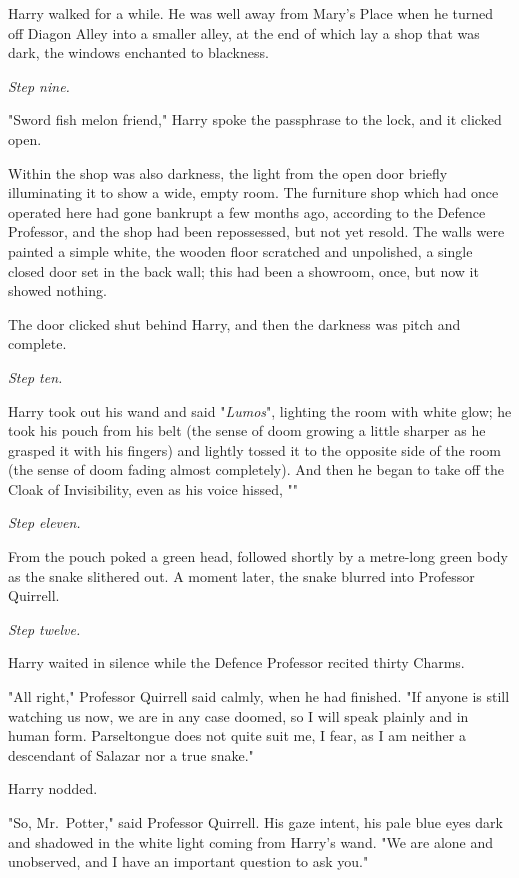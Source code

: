 Harry walked for a while. He was well away from Mary's Place when he turned off
Diagon Alley into a smaller alley, at the end of which lay a shop that was
dark, the windows enchanted to blackness.

\emph{Step nine.}

"Sword fish melon friend," Harry spoke the passphrase to the lock, and it
clicked open.

Within the shop was also darkness, the light from the open door briefly
illuminating it to show a wide, empty room. The furniture shop which had once
operated here had gone bankrupt a few months ago, according to the Defence
Professor, and the shop had been repossessed, but not yet resold. The walls
were painted a simple white, the wooden floor scratched and unpolished, a
single closed door set in the back wall; this had been a showroom, once, but
now it showed nothing.

The door clicked shut behind Harry, and then the darkness was pitch and
complete.

\emph{Step ten.}

Harry took out his wand and said "\emph{Lumos}", lighting the room with white
glow; he took his pouch from his belt (the sense of doom growing a little
sharper as he grasped it with his fingers) and lightly tossed it to the
opposite side of the room (the sense of doom fading almost completely). And
then he began to take off the Cloak of Invisibility, even as his voice hissed,
""

\emph{Step eleven.}

From the pouch poked a green head, followed shortly by a metre-long green body
as the snake slithered out. A moment later, the snake blurred into Professor
Quirrell.

\emph{Step twelve.}

Harry waited in silence while the Defence Professor recited thirty Charms.

"All right," Professor Quirrell said calmly, when he had finished. "If anyone
is still watching us now, we are in any case doomed, so I will speak plainly
and in human form. Parseltongue does not quite suit me, I fear, as I am neither
a descendant of Salazar nor a true snake."

Harry nodded.

"So, Mr.~Potter," said Professor Quirrell. His gaze intent, his pale blue eyes
dark and shadowed in the white light coming from Harry's wand. "We are alone
and unobserved, and I have an important question to ask you."

